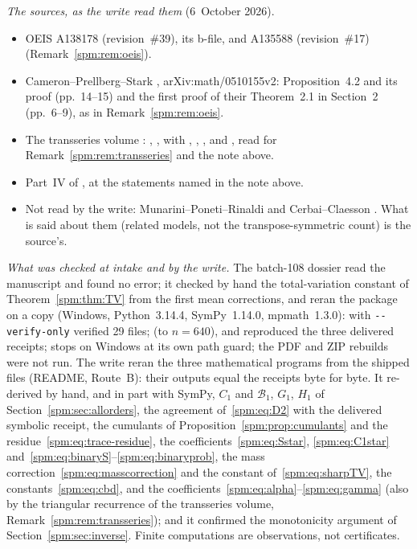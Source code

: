 \begin{writenote}
\emph{The sources, as the write read them} (6~October 2026).
\begin{itemize}\raggedright
\item OEIS A138178 (revision~\#39), its b-file, and A135588
 (revision~\#17) (Remark~\ref{spm:rem:oeis}).
\item Cameron--Prellberg--Stark \cite{cps}, arXiv:math/0510155v2:
 Proposition~4.2 and its proof (pp.~14--15) and the first proof of their
 Theorem~2.1 in Section~2 (pp.~6--9), as in Remark~\ref{spm:rem:oeis}.
\item The transseries volume
 :
 , ,
  with ,
 , ,
  and , read for
 Remark~\ref{spm:rem:transseries} and the note above.
\item Part~IV of , at the statements
 named in the note above.
\item Not read by the write: Munarini--Poneti--Rinaldi \cite{matrixcomp}
 and Cerbai--Claesson \cite{caylerian}. What is said about them (related
 models, not the transpose-symmetric count) is the source's.
\end{itemize}

\emph{What was checked at intake and by the write.} The batch-108 dossier
read the manuscript and found no error; it checked by hand the
total-variation constant of Theorem~\ref{spm:thm:TV} from the first mean
corrections, and reran the package on a copy (Windows, Python~3.14.4,
SymPy~1.14.0, mpmath~1.3.0):  with \verb|--verify-only|
verified 29 files;  (to $n=640$),
 and  reproduced the
three delivered receipts;  stops on Windows at its
own path guard; the PDF and ZIP rebuilds were not run. The write reran the
three mathematical programs from the shipped files (README, Route~B):
their outputs equal the receipts byte for byte. It re-derived by hand,
and in part with SymPy, $C_1$ and $\mathcal B_1$, $G_1$, $H_1$ of
Section~\ref{spm:sec:allorders}, the agreement of~\eqref{spm:eq:D2} with
the delivered symbolic receipt, the cumulants of
Proposition~\ref{spm:prop:cumulants} and the residue~\eqref{spm:eq:trace-residue},
the coefficients~\eqref{spm:eq:Sstar}, \eqref{spm:eq:C1star}
and~\eqref{spm:eq:binaryS}--\eqref{spm:eq:binaryprob}, the mass
correction~\eqref{spm:eq:masscorrection} and the constant
of~\eqref{spm:eq:sharpTV}, the constants~\eqref{spm:eq:cbd}, and the
coefficients~\eqref{spm:eq:alpha}--\eqref{spm:eq:gamma} (also by the
triangular recurrence of the transseries volume,
Remark~\ref{spm:rem:transseries}); and it confirmed the monotonicity
argument of Section~\ref{spm:sec:inverse}. Finite computations are
observations, not certificates.


\end{writenote}

